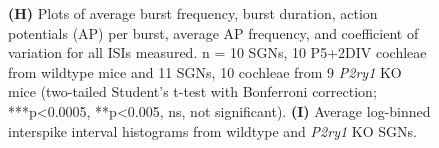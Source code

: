 \documentclass[9pt,lineno]{elife}
\begin{document}
\addtocounter{figure}{-1}
\begin{figure} [t!]
	\begin{fullwidth}
		\caption{\textbf{(H)} Plots of average burst frequency, burst duration, action potentials (AP) per burst, average AP frequency, and coefficient of variation for all ISIs measured. n = 10 SGNs, 10 P5+2DIV cochleae from wildtype mice and 11 SGNs, 10 cochleae from 9 \textit{P2ry1} KO mice (two-tailed Student's t-test with Bonferroni correction; ***p<0.0005, **p<0.005, ns, not significant).
			\textbf{(I)} Average log-binned interspike interval histograms from wildtype and \textit{P2ry1} KO SGNs.
		}
\end{fullwidth}
\end{figure}
\end{document}
